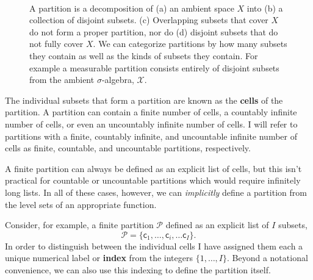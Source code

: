 \documentclass[
  letterpaper,
  DIV=11,
  numbers=noendperiod]{scrartcl}
\begin{document}
\begin{figure}
\begin{minipage}{0.45\linewidth}
{}

\subcaption{\label{fig-partition-meager}}

\end{minipage}%
%
\begin{minipage}{0.05\linewidth}
~\end{minipage}%

\caption{\label{fig-partition}A partition is a decomposition of (a) an
ambient space \(X\) into (b) a collection of disjoint subsets. (c)
Overlapping subsets that cover \(X\) do not form a proper partition, nor
do (d) disjoint subsets that do not fully cover \(X\). We can categorize
partitions by how many subsets they contain as well as the kinds of
subsets they contain. For example a measurable partition consists
entirely of disjoint subsets from the ambient \(\sigma\)-algebra,
\(\mathcal{X}\).}

\end{figure}%

The individual subsets that form a partition are known as the
\textbf{cells} of the partition. A partition can contain a finite number
of cells, a countably infinite number of cells, or even an uncountably
infinite number of cells. I will refer to partitions with a finite,
countably infinite, and uncountable infinite number of cells as finite,
countable, and uncountable partitions, respectively.

A finite partition can always be defined as an explicit list of cells,
but this isn't practical for countable or uncountable partitions which
would require infinitely long lists. In all of these cases, however, we
can \emph{implicitly} define a partition from the level sets of an
appropriate function.

Consider, for example, a finite partition \(\mathcal{P}\) defined as an
explicit list of \(I\) subsets, \[
\mathcal{P}
=
\{ \mathsf{c}_{1}, \ldots, \mathsf{c}_{i}, \ldots \mathsf{c}_{I} \}.
\] In order to distinguish between the individual cells I have assigned
them each a unique numerical label or \textbf{index} from the integers
\(\{1, \ldots, I \}\). Beyond a notational convenience, we can also use
this indexing to define the partition itself.
\end{document}
